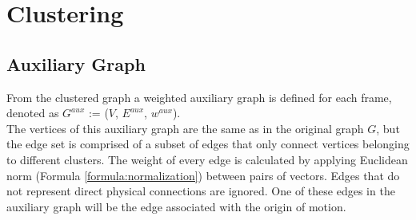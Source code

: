 \chapter{Clustering}

\section{Auxiliary Graph}
From the clustered graph a weighted auxiliary graph is defined for each frame, denoted as $G^{aux}$ := ($V$, $E^{aux}$, $w^{aux}$). \\
The vertices of this auxiliary graph are the same as in the original graph $G$, but the edge set is comprised of a subset of edges that only connect vertices belonging to different clusters.
The weight of every edge is calculated by applying Euclidean norm (Formula \ref{formula:normalization}) between pairs of vectors.
Edges that do not represent direct physical connections are ignored.
One of these edges in the auxiliary graph will be the edge associated with the origin of motion.
\\

